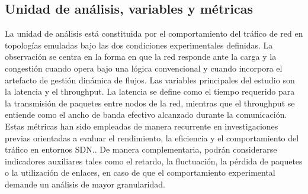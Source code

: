 \documentclass[12pt,a4paper]{article}
\begin{document}
\subsection{Unidad de análisis, variables y métricas}
La unidad de análisis está constituida por el comportamiento del tráfico de red en topologías emuladas bajo las dos condiciones experimentales definidas. La observación se centra en la forma en que la red responde ante la carga y la congestión cuando opera bajo una lógica convencional y cuando incorpora el artefacto de gestión dinámica de flujos.
Las variables principales del estudio son la latencia y el throughput. La latencia se define como el tiempo requerido para la transmisión de paquetes entre nodos de la red, mientras que el throughput se entiende como el ancho de banda efectivo alcanzado durante la comunicación. Estas métricas han sido empleadas de manera recurrente en investigaciones previas orientadas a evaluar el rendimiento, la eficiencia y el comportamiento del tráfico en entornos SDN\parencite{moora_sdn, ddqn_sdn, adaptive_lb_sdn}.. De manera complementaria, podrán considerarse indicadores auxiliares tales como el retardo, la fluctuación, la pérdida de paquetes o la utilización de enlaces, en caso de que el comportamiento experimental demande un análisis de mayor granularidad.
\end{document}
